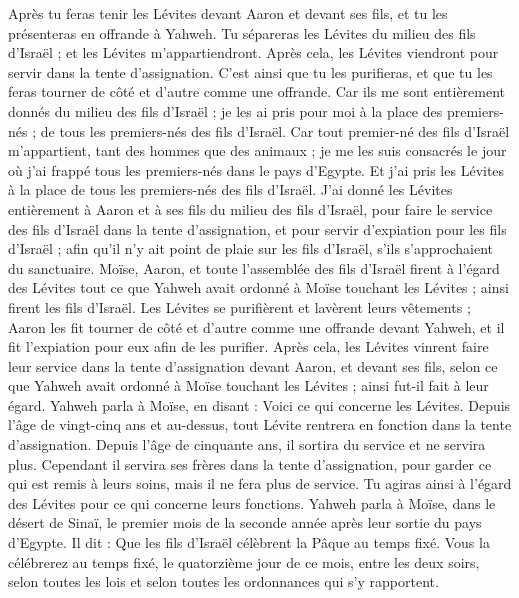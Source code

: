\begin{multicols}{2}
Après tu feras tenir les Lévites devant Aaron et devant ses fils, et tu les présenteras en offrande à Yahweh.
Tu sépareras les Lévites du milieu des fils d'Israël ; et les Lévites m’appartiendront.
Après cela, les Lévites viendront pour servir dans la tente d'assignation. C’est ainsi que tu les purifieras, et que tu les feras tourner de côté et d’autre comme une offrande.
Car ils me sont entièrement donnés du milieu des fils d'Israël ; je les ai pris pour moi à la place des premiers-nés ; de tous les premiers-nés des fils d'Israël.
Car tout premier-né des fils d'Israël m’appartient, tant des hommes que des animaux ; je me les suis consacrés le jour où j’ai frappé tous les premiers-nés dans le pays d'Egypte.
Et j'ai pris les Lévites à la place de tous les premiers-nés des fils d'Israël.
J'ai donné les Lévites entièrement à Aaron et à ses fils du milieu des fils d'Israël, pour faire le service des fils d'Israël dans la tente d'assignation, et pour servir d’expiation pour les fils d'Israël ; afin qu'il n'y ait point de plaie sur les fils d'Israël, s’ils s'approchaient du sanctuaire.
Moïse, Aaron, et toute l'assemblée des fils d'Israël firent à l’égard des Lévites tout ce que Yahweh avait ordonné à Moïse touchant les Lévites ; ainsi firent les fils d'Israël.
Les Lévites se purifièrent et lavèrent leurs vêtements ; Aaron les fit tourner de côté et d’autre comme une offrande devant Yahweh, et il fit l'expiation pour eux afin de les purifier.
Après cela, les Lévites vinrent faire leur service dans la tente d'assignation devant Aaron, et devant ses fils, selon ce que Yahweh avait ordonné à Moïse touchant les Lévites ; ainsi fut-il fait à leur égard.
Yahweh parla à Moïse, en disant :
Voici ce qui concerne les Lévites. Depuis l'âge de vingt-cinq ans et au-dessus, tout Lévite rentrera en fonction dans la tente d'assignation.
Depuis l'âge de cinquante ans, il sortira du service et ne servira plus.
Cependant il servira ses frères dans la tente d'assignation, pour garder ce qui est remis à leurs soins, mais il ne fera plus de service. Tu agiras ainsi à l’égard des Lévites pour ce qui concerne leurs fonctions.
\VerseOne{}Yahweh parla à Moïse, dans le désert de Sinaï, le premier mois de la seconde année après leur sortie du pays d'Egypte. Il dit :
Que les fils d'Israël célèbrent la Pâque au temps fixé.
Vous la célébrerez au temps fixé, le quatorzième jour de ce mois, entre les deux soirs, selon toutes les lois et selon toutes les ordonnances qui s’y rapportent.

\end{multicols}

